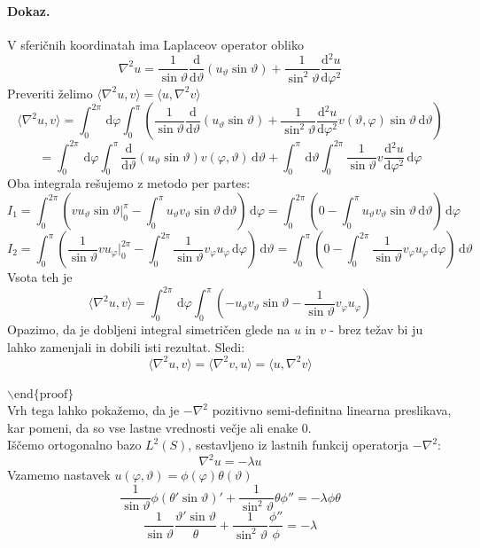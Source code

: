 \documentclass[a4paper]{article}
\newcommand{\dif}{\,\mathrm{d}}
\newcommand{\dd}[2]{\frac{\mathrm{d} {#1}}{\mathrm{d} {#2}}}
\newcommand{\avg}[1]{\langle {#1} \rangle}
\begin{document}
\paragraph{Dokaz.} V sferičnih koordinatah ima Laplaceov operator obliko \[\nabla^2u = \frac{1}{\sin\vartheta}\dd{}{\vartheta}\left(u_\vartheta\sin\vartheta\right) + \frac{1}{\sin^2\vartheta}\dd{^2u}{\varphi^2}\]
Preveriti želimo \(\avg{\nabla^2u, v} = \avg{u, \nabla^2v}\)
\[\avg{\nabla^2u, v} = \int_{0}^{2\pi}\dif\varphi\int_{0}^{\pi}\left(\frac{1}{\sin\vartheta}\dd{}{\vartheta}(u_\vartheta \sin\vartheta) + \frac{1}{\sin^2\vartheta}\dd{^2u}{\varphi^2}v(\vartheta, \varphi)\sin\vartheta\dif\vartheta\right)\]
\[= \int_{0}^{2\pi} \dif\varphi \int_{0}^{\pi}\dd{}{\vartheta}(u_\vartheta\sin\vartheta)v(\varphi, \vartheta)\dif\vartheta + \int_{0}^{\pi} \dif\vartheta \int_{0}^{2\pi} \frac{1}{\sin\vartheta}v \dd{^2u}{\varphi^2}\dif\varphi\]
Oba integrala rešujemo z metodo per partes:
\[I_1 = \int_{0}^{2\pi} \left(vu_\vartheta\sin\vartheta\Big|_0^\pi - \int_{0}^{\pi} u_\vartheta v_\vartheta \sin\vartheta \dif\vartheta\right)\dif\varphi = \int_{0}^{2\pi} \left(0 - \int_{0}^{\pi} u_\vartheta v_\vartheta \sin\vartheta \dif\vartheta\right)\dif\varphi\]
\[I_2 =  \int_{0}^{\pi}\left(\frac{1}{\sin\vartheta}vu_\varphi\Big|_0^{2\pi} - \int_{0}^{2\pi}\frac{1}{\sin\vartheta}v_\varphi u_\varphi \dif\varphi\right)\dif\vartheta
= \int_{0}^{\pi}\left(0 - \int_{0}^{2\pi}\frac{1}{\sin\vartheta}v_\varphi u_\varphi \dif\varphi\right)\dif\vartheta\]
Vsota teh je \[\avg{\nabla^2u, v} = \int_{0}^{2\pi}\dif\varphi\int_{0}^{\pi}\left(-u_\vartheta v_\vartheta\sin\vartheta - \frac{1}{\sin\vartheta}v_\varphi u_\varphi\right)\]
Opazimo, da je dobljeni integral simetričen glede na \(u\) in \(v\) - brez težav bi ju lahko zamenjali in dobili isti rezultat. Sledi:
\[\avg{\nabla^2u, v} = \avg{\nabla^2v, u} = \avg{u, \nabla^2 v}\] \\
\(\backslash\mathrm{end}\{\mathrm{proof}\}\) \\
Vrh tega lahko pokažemo, da je \(-\nabla^2\) pozitivno semi-definitna linearna preslikava, kar pomeni, da so vse lastne vrednosti večje ali enake 0. \\[3mm]
Iščemo ortogonalno bazo \(L^2(S)\), sestavljeno iz lastnih funkcij operatorja \(-\nabla^2\):
\[\nabla^2u = -\lambda u\]
Vzamemo nastavek \(u(\varphi, \vartheta) = \phi(\varphi)\theta(\vartheta)\)
\[\frac{1}{\sin\vartheta}\phi(\theta'\sin\vartheta)' + \frac{1}{\sin^2\vartheta}\theta\phi'' = -\lambda\phi\theta\]
\[\frac{1}{\sin\vartheta}\frac{\vartheta'\sin\vartheta}{\theta} + \frac{1}{\sin^2\vartheta}\frac{\phi''}{\phi} = -\lambda\]
\end{document}
